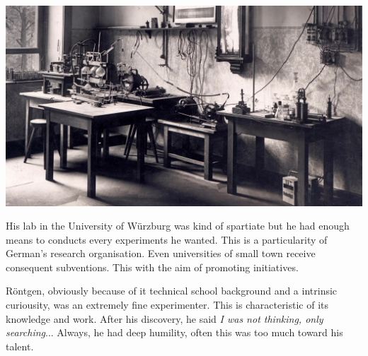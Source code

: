 \documentclass[a4paper,12pt]{report}
\begin{document}
\begin{center}
  \includegraphics[scale = 0.2 ]{lab.jpg}
  \label{lab}
\end{center}

His lab in the University of Würzburg was kind of spartiate but he had enough means to conducts every experiments he wanted. This is a particularity of German's research organisation. Even universities of small town receive consequent subventions. This with the aim of promoting initiatives.

Röntgen, obviously because of it technical school background and a intrinsic curiousity, was an extremely fine experimenter. This is characteristic of its knowledge and work. After his discovery, he said \textit{I was not thinking, only searching}... Always, he had deep humility, often this was too much toward his talent.
\end{document}
